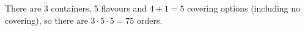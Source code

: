 There are $3$ containers, $5$ flavours and $4+1=5$ covering options (including no covering), so there are $3\cdot5\cdot5=\boxed{75}$ orders.
